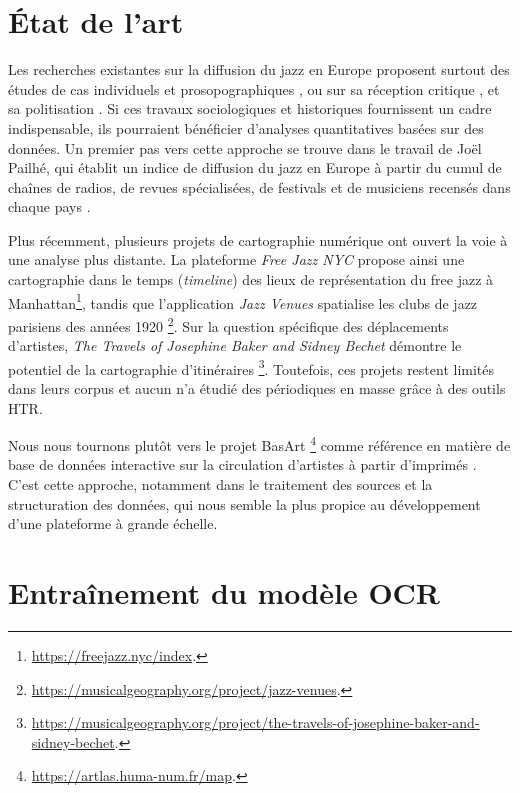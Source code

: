 \documentclass[fra, final]{anthology-ch}      %
\begin{document}
	
	\section{État de l'art}

	Les recherches existantes sur la diffusion du jazz en Europe proposent surtout des études de cas individuels et prosopographiques  \cite{clark_making_2017,ross_jazz_2000,braggs_jazz_2016}, ou sur sa réception critique \cite{sklower_rebel_2008,roueff_espace_2019}, et sa politisation \cite{drott_free_2008,le_texier_critique_2018}. Si ces travaux sociologiques et historiques fournissent un cadre indispensable, ils pourraient bénéficier d'analyses quantitatives basées sur des données. Un premier pas vers cette approche se trouve dans le travail de Joël Pailhé, qui établit un indice de diffusion du jazz en Europe à partir du cumul de chaînes de radios, de revues spécialisées, de festivals et de musiciens recensés dans chaque pays \cite{pailhe_jazz_1998}.
	
	Plus récemment, plusieurs projets de cartographie numérique ont ouvert la voie à une analyse plus distante. La plateforme \textit{Free Jazz NYC} propose ainsi une cartographie dans le temps (\textit{timeline}) des lieux de représentation du free jazz à Manhattan\footnote{\url{https://freejazz.nyc/index}.}, tandis que l'application \textit{Jazz Venues} spatialise les clubs de jazz parisiens des années 1920  \footnote{\url{https://musicalgeography.org/project/jazz-venues}.}. Sur la question spécifique des déplacements d'artistes, \textit{The Travels of Josephine Baker and Sidney Bechet} démontre le potentiel de la cartographie d'itinéraires \footnote{\url{https://musicalgeography.org/project/the-travels-of-josephine-baker-and-sidney-bechet}.}. Toutefois, ces projets restent limités dans leurs corpus et aucun n'a étudié des périodiques en masse grâce à des outils HTR.
	
	Nous nous tournons plutôt vers le projet BasArt \footnote{\url{https://artlas.huma-num.fr/map}.} comme référence en matière de base de données interactive sur la circulation d'artistes à partir d'imprimés \cite{de_maupeou_cartographie_2012}. C'est cette approche, notamment dans le traitement des sources et la structuration des données, qui nous semble la plus propice au développement d'une plateforme à grande échelle.
	
	
	\section{Entraînement du modèle OCR}
	
\end{document}
